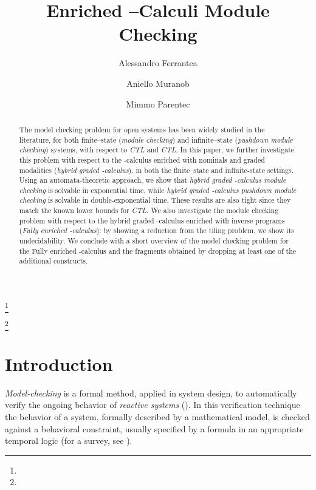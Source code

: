 \documentclass{LMCS}
\theoremstyle{plain}
\def \CTL           {\emph{CTL}\xspace}
\def \CTLSTAR       {\emph{CTL}\xspace}
\begin{document}
\title{Enriched --Calculi Module Checking\rsuper *}

\author[A.~Ferrante] {Alessandro Ferrante\rsuper a}
\address{{}Universit\`a di Salerno, Via Ponte don Melillo, 84084 -
Fisciano (SA), Italy} 
\thanks{}


\author[A.~Murano]{Aniello Murano\rsuper b}
\address{{\lsuper b}Universit\`{a} di Napoli ``Federico II'', Dipartimento di
Scienze Fisiche, 80126 Napoli, Italy} 
\thanks{}

\author[M.~Parente]{Mimmo Parente\rsuper c}



\begin{abstract}
The model checking problem for open systems has been widely studied in the
literature, for both finite--state (\emph{module checking}) and infinite--state
(\emph{pushdown module checking}) systems, with respect to \CTL and \CTLSTAR.
In this paper, we further investigate this problem with respect to the
-calculus enriched with nominals and graded modalities (\emph{hybrid
graded -calculus}), in both the finite--state and infinite-state settings.
Using an automata-theoretic approach, we show that \emph{hybrid graded
-calculus module checking} is solvable in exponential time, while
\emph{hybrid graded -calculus pushdown module checking} is solvable in
double-exponential time. These results are also tight since they match the
known lower bounds for \CTL. We also investigate the module checking problem
with respect to the hybrid graded -calculus enriched with inverse programs
(\emph{Fully enriched -calculus}): by showing a reduction from the tiling
problem, we show its undecidability. We conclude with a short overview of the
model checking problem for the Fully enriched -calculus and the fragments
obtained by dropping at least one of the additional constructs.
\end{abstract}

\maketitle

\section{Introduction}\label{sec:Introduction}
\emph{Model-checking} is a formal method, applied in system design, to
automatically verify the ongoing behavior of \emph{reactive systems}
(\cite{CE81,QS81}). In this verification technique the behavior of a system,
formally described by a mathematical model, is checked against a behavioral
constraint, usually specified by a formula in an appropriate temporal logic
(for a survey, see \cite{CGP99}).
\end{document}
